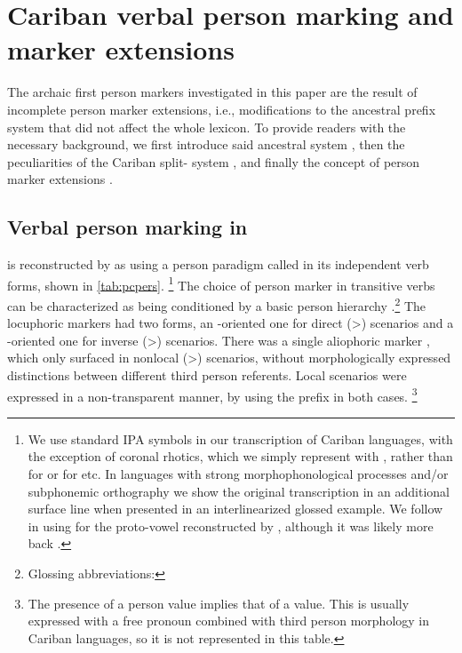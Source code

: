 \section{Cariban verbal person marking and marker extensions}
The archaic first person markers investigated in this paper are the result of incomplete person marker extensions, i.e., modifications to the ancestral prefix system that did not affect the whole lexicon.
To provide readers with the necessary background, we first introduce said ancestral system , then the peculiarities of the Cariban split- system , and finally the concept of person marker extensions .

\subsection{Verbal person marking in \PC}
\label{sec:pc_person}
\PC is reconstructed by \textcite{gildea1998} as using a person paradigm called \setone in its independent verb forms, shown in \cref{tab:pcpers}.%
\footnote{We use standard IPA symbols in our transcription of Cariban languages, with the exception of coronal rhotics, which we simply represent with , rather than  for \wayana or  for \maqui etc.
In languages with strong morphophonological processes and/or subphonemic orthography we show the original transcription in an additional surface line when presented in an interlinearized glossed example.
We follow \textcite{gildea2018reconstructing} in using  for the proto-vowel reconstructed by \textcite{meira2005southern}, although it was likely more back \parencite{gildea2010story}.}
The choice of person marker in transitive verbs can be characterized as being conditioned by a basic person hierarchy .\footnote{Glossing abbreviations: }%
The locuphoric markers had two forms, an -oriented one for direct (>) scenarios and a -oriented one for inverse (>) scenarios.
There was a single aliophoric marker , which only surfaced in nonlocal (>) scenarios, without morphologically expressed distinctions between different third person referents.
Local scenarios were expressed in a non-transparent manner, by using the  prefix  in both cases.%
\footnote{The presence of a  person value implies that of a  value.
This is usually expressed with a free pronoun combined with third person morphology in Cariban languages, so it is not represented in this table.}

